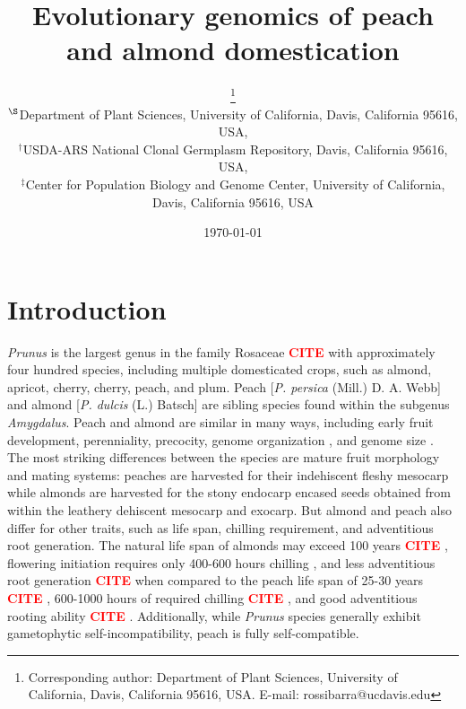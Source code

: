 \documentclass[12pt]{article}
\newcommand{\citex}{\textcolor{red}{\bf CITE }}
\begin{document}
\title{Evolutionary genomics of peach \\and almond domestication}

\author{\small{}\thanks{Corresponding author: Department of Plant Sciences, University of California, Davis, California 95616, USA. E-mail: \mbox{rossibarra@ucdavis.edu}} \\[0.3cm]
     \small\sf $^{\S}$Department of Plant Sciences, University of California, Davis, California 95616, USA,\\
     \small\sf $^{\dag}$USDA-ARS National Clonal Germplasm Repository, Davis, California 95616, USA,\\
     \small\sf $^{\ddag}$Center for Population Biology and Genome Center, University of California, Davis, California 95616, USA}

\date{\today}
\maketitle
\section*{Introduction}

\emph{Prunus} is the largest genus in the family Rosaceae \citex with approximately four hundred species, including multiple domesticated crops, such as almond, apricot, cherry, cherry, peach, and plum.
%
Peach [\emph{P. persica} (Mill.) D. A. Webb] and almond [\emph{P. dulcis} (L.) Batsch] are sibling species found within the subgenus \emph{Amygdalus}.
%
Peach and almond are similar in many ways, including early fruit development, perenniality, precocity, genome organization \citep{arus2012peach}, and genome size \citep{baird1994estimating}. 
%
The most striking differences between the species are mature fruit morphology and mating systems: peaches are harvested for their indehiscent fleshy mesocarp while almonds are harvested for the stony endocarp encased seeds obtained from within the leathery dehiscent mesocarp and exocarp. 
%
But almond and peach also differ for other traits, such as life span, chilling requirement, and adventitious root generation.
%
The natural life span of almonds may exceed 100 years \citex,
flowering initiation requires only 400-600 hours chilling \citep{alonso2005determination}, 
and less adventitious root generation \citex when compared to the peach life span of 25-30 years \citex, 
600-1000 hours of required chilling \citex, 
and good adventitious rooting ability \citex. 
%
Additionally, while \emph{Prunus} species generally exhibit gametophytic self-incompatibility, peach is fully self-compatible.
\end{document}
